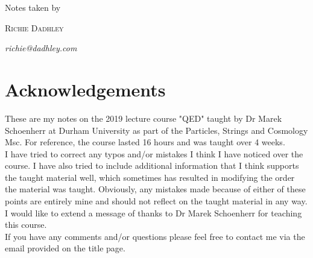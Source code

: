 \documentclass[11pt,oneside]{book}
\theoremstyle{definition} %
\theoremstyle{plain} %
\theoremstyle{remark} %
\theoremstyle{underline}
\begin{document}
\begin{titlepage}
	    Notes taken by 
	
	    \vspace{0.5\baselineskip} %
	
	    {\scshape\Large Richie Dadhley} %
	   
	    \vspace{0.5\baselineskip} %
	    \textit{richie@dadhley.com} %
	
	    \vfill %
\end{titlepage}




\newpage
\section*{Acknowledgements}

These are my notes on the 2019 lecture course "QED" taught by Dr Marek Schoenherr at Durham University as part of the Particles, Strings and Cosmology Msc. For reference, the course lasted 16 hours and was taught over 4 weeks. \\

I have tried to correct any typos and/or mistakes I think I have noticed over the course. I have also tried to include additional information that I think supports the taught material well, which sometimes has resulted in modifying the order the material was taught. Obviously, any mistakes made because of either of these points are entirely mine and should not reflect on the taught material in any way. \\



I would like to extend a message of thanks to Dr Marek Schoenherr for teaching this course. \\

If you have any comments and/or questions please feel free to contact me via the email provided on the title page. \\
\end{document}
